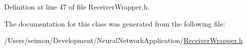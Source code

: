 Definition at line 47 of file ReceiverWrapper.h.



The documentation for this class was generated from the following file:\begin{DoxyCompactItemize}
\item 
/Users/seimon/Development/NeuralNetworkApplication/\hyperlink{_receiver_wrapper_8h}{ReceiverWrapper.h}\end{DoxyCompactItemize}
